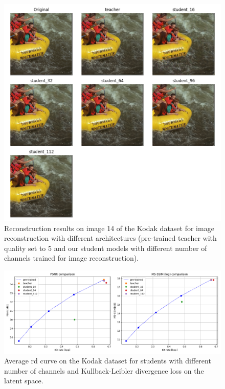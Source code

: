 \documentclass{article}
\begin{document}
\begin{figure}
  \centering
  \includegraphics[width=15cm]{../img/kd_ae_kodak_14.png}
  \caption[Reconstruction results on image 14 of the Kodak dataset for image reconstruction with different architectures.]{Reconstruction results on image 14 of the Kodak dataset for image reconstruction with different architectures (pre-trained teacher with \textsf{quality} set to 5 and our student models with different number of channels trained for image reconstruction).}
  \label{appendix:kd_ae_1:a}
\end{figure}

\begin{figure}
  \centering
  \includegraphics[width=15cm]{../img/kd_lic_rd_channels_kld.png}
  \caption[Average \acrshort{rd} curve on the Kodak dataset for students with different number of channels and Kullback-Leibler divergence loss on the latent space.]{Average \acrshort{rd} curve on the Kodak dataset for students with different number of channels and Kullback-Leibler divergence loss on the latent space.}
  \label{appendix:kd_lic_1_kld}
\end{figure}
\end{document}
